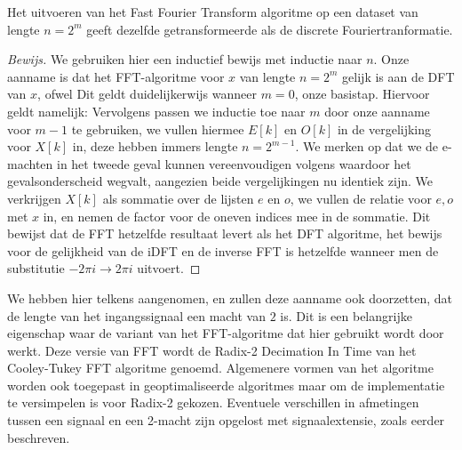 \begin{stelling}[]
  Het uitvoeren van het Fast Fourier Transform algoritme op een dataset van lengte $n=2^m$ geeft
  dezelfde getransformeerde als de discrete Fouriertranformatie.
\end{stelling}
\begin{proof}[Bewijs]
  We gebruiken hier een inductief bewijs met inductie naar $n$. Onze aanname is dat het FFT-algoritme voor $x$ van lengte $n=2^m$ gelijk is aan de DFT van $x$, ofwel
  Dit geldt duidelijkerwijs wanneer $m=0$, onze basistap. Hiervoor geldt namelijk:
  Vervolgens passen we inductie toe naar $m$ door onze aanname voor $m-1$ te gebruiken,
  we vullen hiermee $E[k]$ en $O[k]$ in de vergelijking voor $X[k]$ in, deze hebben immers lengte $n=2^{m-1}$.
  We merken op dat we de e-machten in het tweede geval kunnen vereenvoudigen volgens
  waardoor het gevalsonderscheid wegvalt, aangezien beide vergelijkingen nu identiek zijn.
  We verkrijgen $X[k]$ als sommatie over de lijsten $e$ en $o$, we vullen de relatie voor $e,o$ met $x$ in, en nemen de factor voor de oneven indices mee in de sommatie.
  Dit bewijst dat de FFT hetzelfde resultaat levert als het DFT algoritme, het bewijs voor de gelijkheid van de iDFT en de inverse FFT is
  hetzelfde wanneer men de substitutie $-2\pi i \rightarrow 2\pi i$ uitvoert.
\end{proof}

\begin{opmerk}
  We hebben hier telkens aangenomen, en zullen deze aanname ook doorzetten,
  dat de lengte van het ingangssignaal een macht van $2$ is. Dit is een belangrijke
  eigenschap waar de variant van het FFT-algoritme dat hier gebruikt wordt door werkt. Deze versie van FFT wordt
  de Radix-2 Decimation In Time van het Cooley-Tukey FFT algoritme genoemd. Algemenere vormen van het algoritme
  worden ook toegepast in geoptimaliseerde algoritmes maar om de implementatie te versimpelen
  is voor Radix-2 gekozen. Eventuele verschillen in afmetingen tussen een signaal en
  een 2-macht zijn opgelost met signaalextensie, zoals eerder beschreven.
\end{opmerk}

